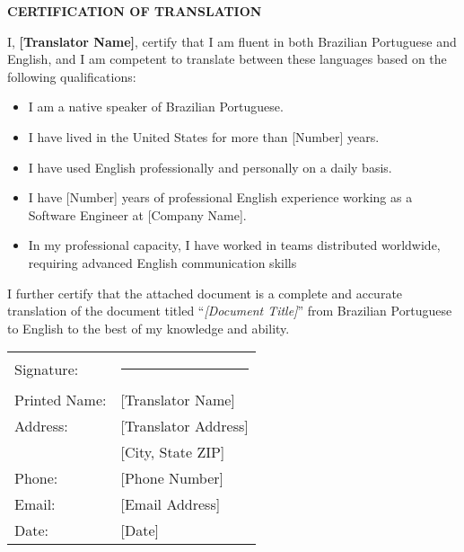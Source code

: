 \documentclass[12pt,letterpaper]{article}
\newcommand{\documenttitle}{[Document Title]}
\newcommand{\translatorname}{[Translator Name]}
\newcommand{\translatoraddress}{[Translator Address]}
\newcommand{\translatorcity}{[City, State ZIP]}
\newcommand{\translatorphone}{[Phone Number]}
\newcommand{\translatoremail}{[Email Address]}
\newcommand{\translationdate}{[Date]}
\newcommand{\yearsinusa}{[Number]}
\newcommand{\yearsprofessional}{[Number]}
\newcommand{\companyname}{[Company Name]}
\begin{document}
\begin{center}
    \Large\textbf{CERTIFICATION OF TRANSLATION}
\end{center}

\vspace{0.5cm}

\onehalfspacing

I, \textbf{\translatorname}, certify that I am fluent in both Brazilian Portuguese and English, and I am competent to translate between these languages based on the following qualifications:

\begin{itemize}[leftmargin=0.5in,itemsep=0.1cm]
    \item I am a native speaker of Brazilian Portuguese.
    \item I have lived in the United States for more than \yearsinusa{} years.
    \item I have used English professionally and personally on a daily basis.
    \item I have \yearsprofessional{} years of professional English experience working as a Software Engineer at \companyname.
    \item In my professional capacity, I have worked in teams distributed worldwide, requiring advanced English communication skills
\end{itemize}

\vspace{0.4cm}

I further certify that the attached document is a complete and accurate translation of the document titled ``\textit{\documenttitle}'' from Brazilian Portuguese to English to the best of my knowledge and ability.

\vspace{2cm}

\begin{tabular}{ll}
    Signature: & \rule{3in}{0.4pt} \\[0.5cm]
    Printed Name: & \translatorname{} \\[0.3cm]
    Address: & \translatoraddress{} \\
             & \translatorcity{} \\[0.3cm]
    Phone: & \translatorphone{} \\[0.3cm]
    Email: & \translatoremail{} \\[0.3cm]
    Date: & \translationdate{} \\
\end{tabular}
\end{document}
